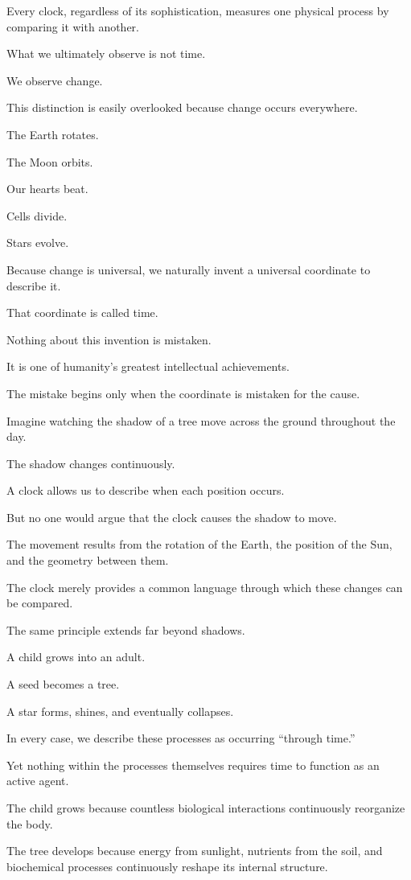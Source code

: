 Every clock, regardless of its sophistication, measures one physical process by comparing it with another.

What we ultimately observe is not time.

We observe change.

This distinction is easily overlooked because change occurs everywhere.

The Earth rotates.

The Moon orbits.

Our hearts beat.

Cells divide.

Stars evolve.

Because change is universal, we naturally invent a universal coordinate to describe it.

That coordinate is called time.

Nothing about this invention is mistaken.

It is one of humanity’s greatest intellectual achievements.

The mistake begins only when the coordinate is mistaken for the cause.

Imagine watching the shadow of a tree move across the ground throughout the day.

The shadow changes continuously.

A clock allows us to describe when each position occurs.

But no one would argue that the clock causes the shadow to move.

The movement results from the rotation of the Earth, the position of the Sun, and the geometry between them.

The clock merely provides a common language through which these changes can be compared.

The same principle extends far beyond shadows.

A child grows into an adult.

A seed becomes a tree.

A star forms, shines, and eventually collapses.

In every case, we describe these processes as occurring “through time.”

Yet nothing within the processes themselves requires time to function as an active agent.

The child grows because countless biological interactions continuously reorganize the body.

The tree develops because energy from sunlight, nutrients from the soil, and biochemical processes continuously reshape its internal structure.

